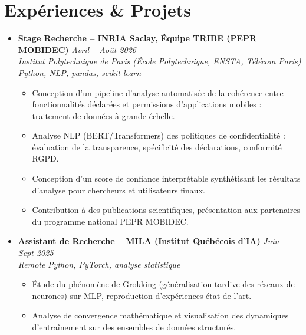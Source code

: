 \documentclass[a4paper,11pt]{article}
\begin{document}
\section{Expériences \& Projets}
\begin{itemize}[leftmargin=*, label={-}]

\item \textbf{Stage Recherche -- INRIA Saclay, Équipe TRIBE (PEPR MOBIDEC)} \hfill \textit{Avril -- Août 2026} \\
\textit{Institut Polytechnique de Paris (École Polytechnique, ENSTA, Télécom Paris)} \hfill \textit{Python, NLP, pandas, scikit-learn}
\vspace{-2pt}
    \begin{itemize}[leftmargin=0.4cm, nosep, label=\tiny$\bullet$]
        \item \small{Conception d'un pipeline d'analyse automatisée de la cohérence entre fonctionnalités déclarées et permissions d'applications mobiles : traitement de données à grande échelle.}
        \item \small{Analyse NLP (BERT/Transformers) des politiques de confidentialité : évaluation de la transparence, spécificité des déclarations, conformité RGPD.}
        \item \small{Conception d'un score de confiance interprétable synthétisant les résultats d'analyse pour chercheurs et utilisateurs finaux.}
        \item \small{Contribution à des publications scientifiques, présentation aux partenaires du programme national PEPR MOBIDEC.}
    \end{itemize}
\vspace{3pt}

\item \textbf{Assistant de Recherche -- MILA (Institut Québécois d'IA)} \hfill \textit{Juin -- Sept 2025} \\
\textit{Remote} \hfill \textit{Python, PyTorch, analyse statistique}
\vspace{-2pt}
    \begin{itemize}[leftmargin=0.4cm, nosep, label=\tiny$\bullet$]
        \item \small{Étude du phénomène de Grokking (généralisation tardive des réseaux de neurones) sur MLP, reproduction d'expériences état de l'art.}
        \item \small{Analyse de convergence mathématique et visualisation des dynamiques d'entraînement sur des ensembles de données structurés.}
    \end{itemize}
\vspace{3pt}


\end{itemize}
\end{document}
